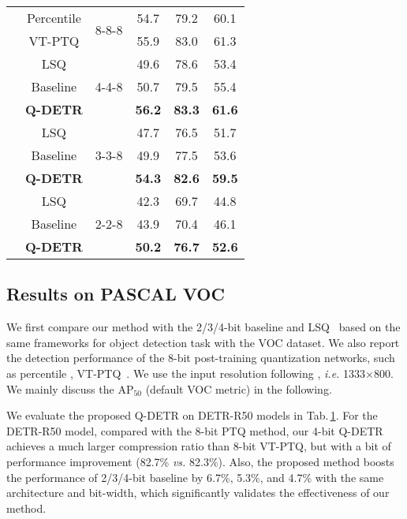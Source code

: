 \documentclass[10pt,twocolumn,letterpaper]{article}
\begin{document}
\begin{table}[]
{\begin{tabular}{cccccc}
& Percentile      & \multirow{2}{*}{8-8-8} & 54.7          & 79.2          & 60.1          \\
& VT-PTQ          &                        & 55.9          & 83.0          & 61.3          \\ \cline{2-6} 
& LSQ             & \multirow{3}{*}{4-4-8} & 49.6          & 78.6          & 53.4          \\
& Baseline        &                        & 50.7          & 79.5          & 55.4          \\
& \textbf{Q-DETR}          &                        & \textbf{56.2} & \textbf{83.3} & \textbf{61.6} \\ \cline{2-6} 
& LSQ             & \multirow{3}{*}{3-3-8} &      47.7         &    76.5           &       51.7        \\
& Baseline        &                        &     49.9          &      77.5         &      53.6         \\
& \textbf{Q-DETR}          &                        &       \textbf{54.3}       & \textbf{82.6}     & \textbf{59.5}     \\ \cline{2-6} 
& LSQ             & \multirow{3}{*}{2-2-8} &        42.3       &      69.7         &      44.8         \\
& Baseline        &                        &     43.9          &    70.4           &      46.1         \\
& \textbf{Q-DETR}          &                        &        \textbf{50.2}       &        \textbf{76.7}       &        \textbf{52.6}       \\ \hline
\end{tabular}}
\label{voc}
\end{table}

\subsection{Results on PASCAL VOC}

We first compare our method with the 2/3/4-bit baseline and  LSQ~\cite{esser2019learned} based on the same frameworks for object detection task with the VOC dataset. We also report the detection performance of the 8-bit post-training quantization networks, such as percentile \cite{lin2021fq}, VT-PTQ~\cite{liu2021post}. We use the input resolution following \cite{carion2020end}, {\em i.e.} 1333$\times$800. We mainly discuss the AP$_{50}$ (default VOC metric) in the following. 

We evaluate the proposed Q-DETR on DETR-R50 models in Tab.\,\ref{voc}. For the DETR-R50 model, compared with the 8-bit PTQ method, our 4-bit Q-DETR achieves a much larger compression ratio than 8-bit VT-PTQ, but with a bit of performance improvement (82.7\% {\em vs.} 82.3\%). Also, the proposed method boosts the performance of 2/3/4-bit baseline by 6.7\%, 5.3\%, and 4.7\% with the same architecture and bit-width, which significantly validates the effectiveness of our method. 
\end{document}
